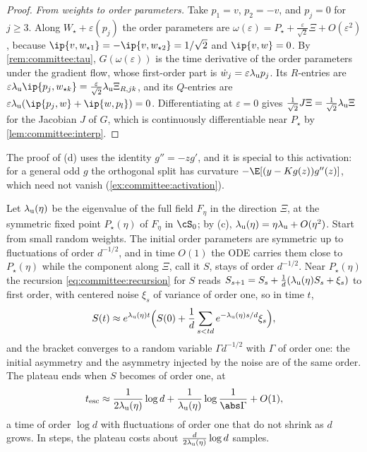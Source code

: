 \begin{refsection}
\begin{proof}
\emph{From weights to order parameters.} Take $p_1=v$, $p_2=-v$, and $p_j=0$ for $j\ge3$. Along $W_\star+\varepsilon(p_j)$ the order parameters are $\omega(\varepsilon)=P_\star+\frac\varepsilon{\sqrt2}\Xi+O(\varepsilon^2)$, because $\ip{v,w_{\star1}}=-\ip{v,w_{\star2}}=1/\sqrt2$ and $\ip{v,w}=0$. By \cref{rem:committee:tau}, $G(\omega(\varepsilon))$ is the time derivative of the order parameters under the gradient flow, whose first-order part is $\dot w_j=\varepsilon\lambda_{\mathrm u} p_j$. Its $R$-entries are $\varepsilon\committeelu\ip{p_j,w_{\star k}}=\frac{\varepsilon}{\sqrt2}\committeelu\Xi_{R,jk}$, and its $Q$-entries are $\varepsilon\committeelu(\ip{p_j,w}+\ip{w,p_l})=0$. Differentiating at $\varepsilon=0$ gives $\frac1{\sqrt2}J\Xi=\frac1{\sqrt2}\lambda_{\mathrm u}\Xi$ for the Jacobian $J$ of $G$, which is continuously differentiable near $P_\star$ by \cref{lem:committee:interp}.
\end{proof}

The proof of (d) uses the identity $g''=-zg'$, and it is special to this activation: for a general odd $g$ the orthogonal split has curvature $-\E[(y-Kg(z))g''(z)]$, which need not vanish (\cref{ex:committee:activation}).

\begin{heuristic}
Let $\lambda_{\mathrm u}(\eta)$ be the eigenvalue of the full field $F_\eta$ in the direction $\Xi$, at the symmetric fixed point $P_\star(\eta)$ of $F_\eta$ in $\cS_0$; by (c), $\lambda_{\mathrm u}(\eta)=\eta\lambda_{\mathrm u}+O(\eta^2)$. Start from small random weights. The initial order parameters are symmetric up to fluctuations of order $d^{-1/2}$, and in time $O(1)$ the ODE carries them close to $P_\star(\eta)$ while the component along $\Xi$, call it $S$, stays of order $d^{-1/2}$. Near $P_\star(\eta)$ the recursion \eqref{eq:committee:recursion} for $S$ reads $S_{s+1}=S_s+\frac1d(\lambda_{\mathrm u}(\eta)S_s+\xi_s)$ to first order, with centered noise $\xi_s$ of variance of order one, so in time $t$,
\[
  S(t)\approx e^{\lambda_{\mathrm u}(\eta)t}\Bigl(S(0)+\frac1d\sum_{s<td}e^{-\lambda_{\mathrm u}(\eta)s/d}\xi_s\Bigr),
\]
and the bracket converges to a random variable $\Gamma d^{-1/2}$ with $\Gamma$ of order one: the initial asymmetry and the asymmetry injected by the noise are of the same order. The plateau ends when $S$ becomes of order one, at
\[
  t_{\mathrm{esc}}\approx\frac{1}{2\committeelu(\eta)}\log d+\frac1{\committeelu(\eta)}\log\frac{1}{\abs\Gamma}+O(1),
\]
a time of order $\log d$ with fluctuations of order one that do not shrink as $d$ grows. In steps, the plateau costs about $\frac{d}{2\lambda_{\mathrm u}(\eta)}\log d$ samples.
\end{heuristic}


\end{refsection}
